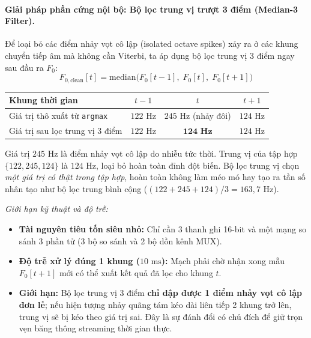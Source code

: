 \documentclass[11pt,a4paper]{article}
\begin{document}
\paragraph{Giải pháp phần cứng nội bộ: Bộ lọc trung vị trượt 3 điểm (Median-3 Filter).}
Để loại bỏ các điểm nhảy vọt cô lập (isolated octave spikes) xảy ra ở các khung chuyển tiếp âm mà không cần Viterbi, ta áp dụng bộ lọc trung vị 3 điểm ngay sau đầu ra $F_0$:
\begin{equation}
F_{0,\text{clean}}[t] = \text{median}\bigl(F_0[t-1],\; F_0[t],\; F_0[t+1]\bigr)
\end{equation}

\begin{center}
\small
\begin{tabular}{@{}lccc@{}}
\toprule
\textbf{Khung thời gian} & $t-1$ & $t$ & $t+1$ \\ \midrule
Giá trị thô xuất từ \texttt{argmax} & $122\text{ Hz}$ & $245\text{ Hz}$ (nhảy đôi) & $124\text{ Hz}$ \\
Giá trị sau lọc trung vị 3 điểm & $122\text{ Hz}$ & $\mathbf{124\text{ Hz}}$ & $124\text{ Hz}$ \\ \bottomrule
\end{tabular}
\end{center}

Giá trị $245\text{ Hz}$ là điểm nhảy vọt cô lập do nhiễu tức thời. Trung vị của tập hợp $\{122, 245, 124\}$ là $124\text{ Hz}$, loại bỏ hoàn toàn đỉnh đột biến. Bộ lọc trung vị chọn \emph{một giá trị có thật trong tập hợp}, hoàn toàn không làm méo mó hay tạo ra tần số nhân tạo như bộ lọc trung bình cộng ($(122+245+124)/3 = 163{,}7\text{ Hz}$).

\textit{Giới hạn kỹ thuật và độ trễ:}
\begin{itemize}
    \setlength{\itemsep}{0.5pt}
    \item \textbf{Tài nguyên tiêu tốn siêu nhỏ:} Chỉ cần 3 thanh ghi 16-bit và một mạng so sánh 3 phần tử (3 bộ so sánh và 2 bộ dồn kênh MUX).
    \item \textbf{Độ trễ xử lý đúng 1 khung ($10\text{ ms}$):} Mạch phải chờ nhận xong mẫu $F_0[t+1]$ mới có thể xuất kết quả đã lọc cho khung $t$.
    \item \textbf{Giới hạn:} Bộ lọc trung vị 3 điểm \textbf{chỉ dập được 1 điểm nhảy vọt cô lập đơn lẻ}; nếu hiện tượng nhảy quãng tám kéo dài liên tiếp 2 khung trở lên, trung vị sẽ bị kéo theo giá trị sai. Đây là sự đánh đổi có chủ đích để giữ trọn vẹn băng thông streaming thời gian thực.
\end{itemize}
\end{document}
